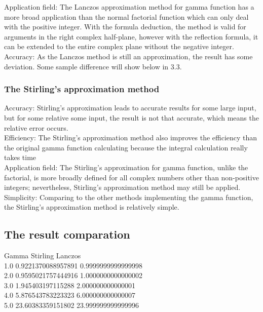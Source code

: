 \documentclass[a4paper, 11pt]{article}
\begin{document}
Application field: The Lanczos approximation method for gamma function has a more broad application than the normal factorial function which can only deal with the positive integer. With the formula deduction, the method is valid for arguments in the right complex half-plane, however with the  reflection formula, it can be extended to the entire complex plane without the negative integer.\\

Accuracy: As the Lanczos method is still an approximation, the result has some deviation. Some sample difference will show below in 3.3.

\subsubsection{ The Stirling's approximation method}
\indent\indent Accuracy: Stirling's approximation leads to accurate results for some large input, but for some relative some input, the result is not that accurate, which means the relative error occurs.\\

Efficiency: The Stirling's approximation method also improves the efficiency than the original gamma function calculating because the integral calculation really takes time \\

Application field: The Stirling's approximation for gamma function, unlike the factorial, is more broadly defined for all complex numbers other than non-positive integers; nevertheless, Stirling's approximation method may still be applied.\\

Simplicity: Comparing to the other methods implementing the gamma function, the Stirling's approximation method is relatively simple.

\subsection{The result comparation}
Gamma \hspace{3cm}		Stirling \hspace{3cm}	Lanczos\\
1.0	\hspace{3cm}	0.9221370088957891\hspace{1cm}	0.9999999999999998\\
2.0	\hspace{3cm}	0.9595021757444916\hspace{1cm}	1.0000000000000002\\
3.0	\hspace{3cm}	1.945403197115288 \hspace{1cm}	2.000000000000001\\
4.0	\hspace{3cm}	5.876543783223323 \hspace{1cm}	6.000000000000007\\
5.0	\hspace{3cm}	23.60383359151802 \hspace{1cm}	23.999999999999996
\end{document}
